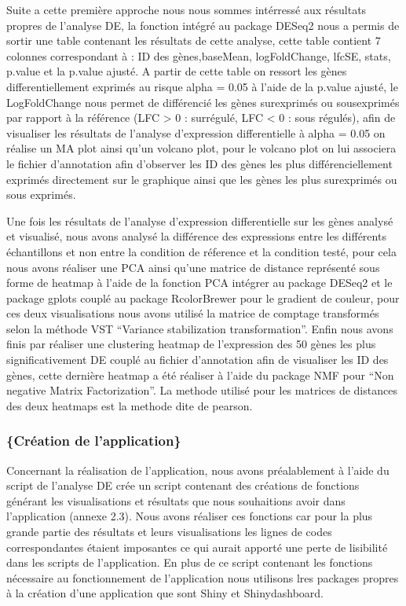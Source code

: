 \documentclass[
  12pt,
]{article}
\begin{document}
Suite a cette première approche nous nous sommes intérressé aux
résultats propres de l'analyse DE, la fonction intégré au package DESeq2
nous a permis de sortir une table contenant les résultats de cette
analyse, cette table contient 7 colonnes correspondant à : ID des
gènes,baseMean, logFoldChange, lfcSE, stats, p.value et la p.value
ajusté. A partir de cette table on ressort les gènes differentiellement
exprimés au risque alpha = 0.05 à l'aide de la p.value ajusté, le
LogFoldChange nous permet de différencié les gènes surexprimés ou
sousexprimés par rapport à la référence (LFC \textgreater{} 0 :
surrégulé, LFC \textless{} 0 : sous régulés), afin de visualiser les
résultats de l'analyse d'expression differentielle à alpha = 0.05 on
réalise un MA plot ainsi qu'un volcano plot, pour le volcano plot on lui
associera le fichier d'annotation afin d'observer les ID des gènes les
plus différenciellement exprimés directement sur le graphique ainsi que
les gènes les plus surexprimés ou sous exprimés.

\par

Une fois les résultats de l'analyse d'expression differentielle sur les
gènes analysé et visualisé, nous avons analysé la différence des
expressions entre les différents échantillons et non entre la condition
de réference et la condition testé, pour cela nous avons réaliser une
PCA ainsi qu'une matrice de distance représenté sous forme de heatmap à
l'aide de la fonction PCA intégrer au package DESeq2 et le package
gplots couplé au package RcolorBrewer pour le gradient de couleur, pour
ces deux visualisations nous avons utilisé la matrice de comptage
transformés selon la méthode VST ``Variance stabilization
transformation''. Enfin nous avons finis par réaliser une clustering
heatmap de l'expression des 50 gènes les plus significativement DE
couplé au fichier d'annotation afin de visualiser les ID des gènes,
cette dernière heatmap a été réaliser à l'aide du package NMF pour ``Non
negative Matrix Factorization''. La methode utilisé pour les matrices de
distances des deux heatmaps est la methode dite de pearson.

\hypertarget{cruxe9ation-de-lapplication}{%
\subsubsection{\texorpdfstring{\normalsize\{Création de
l'application\}}{\{Création de l'application\}}}\label{cruxe9ation-de-lapplication}}

Concernant la réalisation de l'application, nous avons préalablement à
l'aide du script de l'analyse DE crée un script contenant des créations
de fonctions générant les visualisations et résultats que nous
souhaitions avoir dans l'application (annexe 2.3). Nous avons réaliser
ces fonctions car pour la plus grande partie des résultats et leurs
visualisations les lignes de codes correspondantes étaient imposantes ce
qui aurait apporté une perte de lisibilité dans les scripts de
l'application. En plus de ce script contenant les fonctions nécessaire
au fonctionnement de l'application nous utilisons lres packages propres
à la création d'une application que sont Shiny et Shinydashboard.
\end{document}

